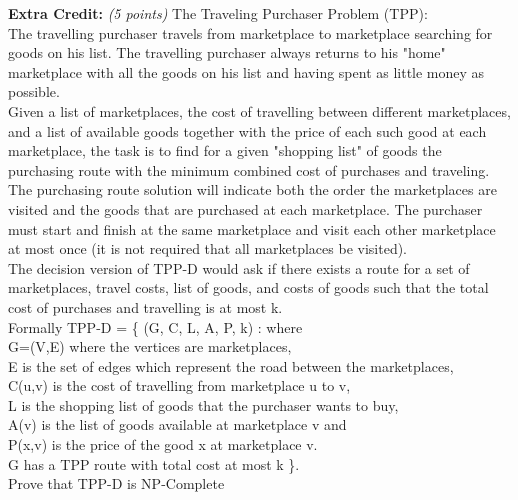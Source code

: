 \documentclass{article}
\begin{document}
\noindent \textbf{Extra Credit:} \textit{(5 points)} The Traveling Purchaser Problem (TPP):
\\[.25cm]
The travelling purchaser travels from marketplace to marketplace searching for goods on his list. The
travelling purchaser always returns to his "home" marketplace with all the goods on his list and having spent as little money as possible.
\\[.25cm]
Given a list of marketplaces, the cost of travelling between different marketplaces, and a list of available goods together with the price of each such good at each marketplace, the task is to find for a given "shopping list" of goods the purchasing route with the minimum combined cost of purchases and traveling. The purchasing route solution will indicate both the order the marketplaces are visited and the goods that are purchased at each marketplace. The purchaser must start and finish at the same marketplace and visit each other marketplace at most once (it is not required that all marketplaces be visited).
\\[.25cm]
The decision version of TPP-D would ask if there exists a route for a set of marketplaces, travel costs, list of goods, and costs of goods such that the total cost of purchases and travelling is at most k.
\\[.25cm]
Formally TPP-D = \{ (G, C, L, A, P, k) : where \\
\indent G=(V,E) where the vertices are marketplaces, \\
\indent E is the set of edges which represent the road between the marketplaces, \\
\indent C(u,v) is the cost of travelling from marketplace u to v, \\
\indent L is the shopping list of goods that the purchaser wants to buy, \\
\indent A(v) is the list of goods available at marketplace v and \\
\indent P(x,v) is the price of the good x at marketplace v. \\
G has a TPP route with total cost at most k \}.
\\[.25cm]
Prove that TPP-D is NP-Complete
\\[.25cm]
\end{document}
